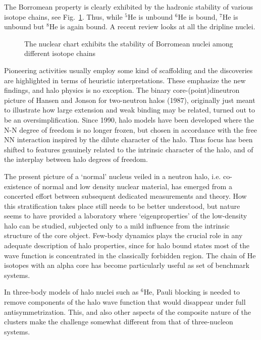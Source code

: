 The Borromean property is clearly exhibited by the hadronic
stability of various isotope chains, see Fig.~\ref{Map}. Thus,
while $^5$He is unbound $^6$He is bound, $^7$He is unbound but
$^8$He is again bound. A recent review \cite{jonson} looks at
all the dripline nuclei.

\begin{figure}[tb]
\centerline{}
\vspace{3mm}
\caption{The nuclear chart exhibits the stability of
Borromean nuclei among different isotope chains \label{Map}}
\end{figure}

Pioneering activities usually employ some kind of scaffolding and
the
 discoveries are highlighted in terms of heuristic interpretations.
 These emphasize the new findings, and halo physics is no exception. The binary
 core-(point)dineutron picture of Hansen and Jonson for two-neutron halos
 (1987), originally just meant to illustrate how large extension and weak
 binding may be related, turned out to be an oversimplification.
 Since 1990, halo models have been developed where the N-N degree of freedom is
 no longer frozen, but chosen in accordance with the free NN interaction
 inspired by the dilute character of the halo. Thus focus has been shifted to
 features genuinely related to the intrinsic character of the halo, and of the
 interplay between halo degrees of freedom.

  The present picture of a `normal' nucleus veiled in a neutron halo,
 i.e. co-existence of normal and low density nuclear material, has emerged from
 a concerted effort between subsequent dedicated measurements and theory. How
 this stratification takes place still needs to be better understood, but
 nature seems to have provided a laboratory where `eigenproperties' of the
 low-density halo can be studied, subjected only to a mild influence from the
 intrinsic structure of the core object.
Few-body dynamics plays the crucial role in any adequate
description of halo properties, since for halo bound states most
of the wave function is concentrated in the classically forbidden
region. The chain of He isotopes with an alpha core has become
particularly  useful as set of benchmark systems.

In three-body models of halo nuclei such as $^6$He, Pauli blocking
is needed to remove components of the halo wave function that
would disappear under full antisymmetrization. This, and also
other aspects of the composite nature of the clusters make the
challenge somewhat different from that of three-nucleon systems.

